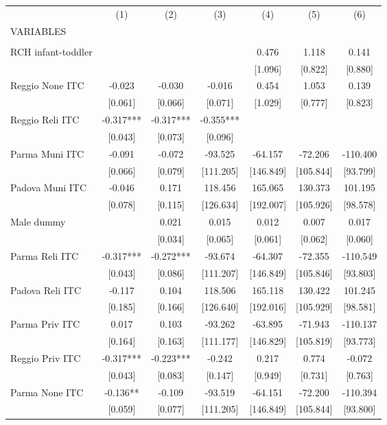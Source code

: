\begin{tabular}{lcccccc} \hline
 & (1) & (2) & (3) & (4) & (5) & (6) \\
VARIABLES &  &  &  &  &  &  \\ \hline
 &  &  &  &  &  &  \\
RCH infant-toddler &  &  &  & 0.476 & 1.118 & 0.141 \\
 &  &  &  & [1.096] & [0.822] & [0.880] \\
Reggio None ITC & -0.023 & -0.030 & -0.016 & 0.454 & 1.053 & 0.139 \\
 & [0.061] & [0.066] & [0.071] & [1.029] & [0.777] & [0.823] \\
Reggio Reli ITC & -0.317*** & -0.317*** & -0.355*** &  &  &  \\
 & [0.043] & [0.073] & [0.096] &  &  &  \\
Parma Muni ITC & -0.091 & -0.072 & -93.525 & -64.157 & -72.206 & -110.400 \\
 & [0.066] & [0.079] & [111.205] & [146.849] & [105.844] & [93.799] \\
Padova Muni ITC & -0.046 & 0.171 & 118.456 & 165.065 & 130.373 & 101.195 \\
 & [0.078] & [0.115] & [126.634] & [192.007] & [105.926] & [98.578] \\
Male dummy &  & 0.021 & 0.015 & 0.012 & 0.007 & 0.017 \\
 &  & [0.034] & [0.065] & [0.061] & [0.062] & [0.060] \\
Parma Reli ITC & -0.317*** & -0.272*** & -93.674 & -64.307 & -72.355 & -110.549 \\
 & [0.043] & [0.086] & [111.207] & [146.849] & [105.846] & [93.803] \\
Padova Reli ITC & -0.117 & 0.104 & 118.506 & 165.118 & 130.422 & 101.245 \\
 & [0.185] & [0.166] & [126.640] & [192.016] & [105.929] & [98.581] \\
Parma Priv ITC & 0.017 & 0.103 & -93.262 & -63.895 & -71.943 & -110.137 \\
 & [0.164] & [0.163] & [111.177] & [146.829] & [105.819] & [93.773] \\
Reggio Priv ITC & -0.317*** & -0.223*** & -0.242 & 0.217 & 0.774 & -0.072 \\
 & [0.043] & [0.083] & [0.147] & [0.949] & [0.731] & [0.763] \\
Parma None ITC & -0.136** & -0.109 & -93.519 & -64.151 & -72.200 & -110.394 \\
 & [0.059] & [0.077] & [111.205] & [146.849] & [105.844] & [93.800] \\

\end{tabular}
